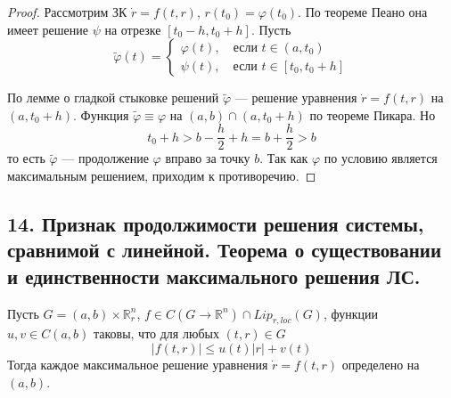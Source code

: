 \begin{proof}
    Рассмотрим ЗК $\dot{r} = f(t,r),\, r(t_0) = \varphi(t_0)$. По теореме Пеано она имеет решение $\psi$ на отрезке $[t_0 - h, t_0 + h]$. Пусть
    \begin{equation*}
        \widetilde{\varphi}(t) = \begin{cases}
            \varphi(t), \quad \text{если } t \in (a, t_0) \\
            \psi(t), \quad \text{если } t \in [t_0, t_0 + h]
        \end{cases}
    \end{equation*}

    По лемме о гладкой стыковке решений $\widetilde{\varphi}$ --- решение уравнения $\dot{r} = f(t,r)$ на $(a, t_0 + h)$. Функция $\widetilde{\varphi} \equiv \varphi$ на $(a,b) \cap (a, t_0 + h)$ по теореме Пикара. Но
    \begin{equation*}
        t_0 + h > b - \frac{h}{2} + h = b + \frac{h}{2} > b
    \end{equation*}
    то есть $\widetilde{\varphi}$ --- продолжение $\varphi$ вправо за точку $b$. Так как $\varphi$ по условию является максимальным решением, приходим к противоречию.
\end{proof}

\subsection*{14. Признак продолжимости решения системы, сравнимой с линейной. Теорема о существовании и единственности максимального решения ЛС.}

\begin{theorem}
    Пусть $G = (a,b) \times \mathbb{R}_r^n$, $f \in C(G \to \mathbb{R}^n) \cap Lip_{r,loc}(G)$, функции $u,v \in C(a,b)$ таковы, что для любых $(t,r) \in G$
    \begin{equation*}
        |f(t,r)| \le u(t)|r| + v(t)
    \end{equation*}
    Тогда каждое максимальное решение уравнения $\dot{r} = f(t,r)$ определено на $(a,b)$.
\end{theorem}

